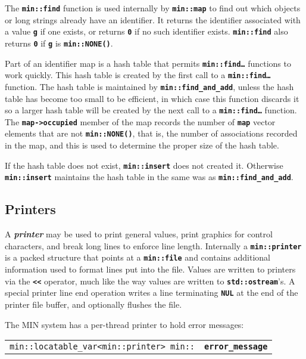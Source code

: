 \documentclass[12pt]{article}
\makeatletter
\newcommand{\TT}[1]{{\tt \bfseries #1}}
\newcommand{\key}[1]{{\bf \em #1}\index{#1}}
\newcommand{\ttindex}[1]{\index{#1@{\tt #1}}}
\newcommand{\EOL}{\penalty \exhyphenpenalty}
\newenvironment{indpar}[1][0.3in]%
	{\begin{list}{}%
		     {\setlength{\itemsep}{0in}%
		      \setlength{\topsep}{0in}%
		      \setlength{\parsep}{1ex}%
		      \setlength{\labelwidth}{#1}%
		      \setlength{\leftmargin}{#1}%
		      \addtolength{\leftmargin}{\labelsep}}%
	 \item}%
	{\end{list}}
\newcommand{\LABEL}[1]{\label{#1}}
\newcommand{\MINKEY}[1]%
	   {\TT{#1}\ttindex{min::#1}\ttindex{#1}}
\makeatother
\begin{document}
The \TT{min::find} function is used internally by \TT{min::map} to find
out which objects or long strings already have an identifier.
It returns the identifier associated with a value \TT{g} if one exists,
or returns \TT{0} if no such identifier exists.
\TT{min::\EOL find} also returns
\TT{0} if \TT{g} is \TT{min::NONE()}.

Part of an identifier map is a hash table that permits
\TT{min::\EOL find\ldots} functions to work quickly.  This
hash table is created by the first call to a
\TT{min::\EOL find\ldots} function.
The hash table is maintained by \TT{min::\EOL find\_\EOL and\_\EOL add},
unless the hash table has become too small to be efficient, in which case
this function discards it so a larger hash table will be created
by the next call to a \TT{min::\EOL find\ldots} function.
The \TT{map->\EOL occupied} member of the map records the number of
\TT{map} vector elements that are not \TT{min::NONE()},
that is, the number of associations recorded in the map, and this is used
to determine the proper size of the hash table.

If the hash table does not exist, \TT{min::\EOL insert} does not created it.
Otherwise \TT{min::\EOL insert} maintains the hash table in the same was
as \TT{min::\EOL find\_\EOL and\_\EOL add}.

\subsection{Printers}
\label{PRINTERS}

A \key{printer} may be used to print general values, print graphics for
control characters, and break long lines to enforce line length.
Internally a \TT{min::\EOL printer} is
a packed structure that points at a \TT{min::\EOL file} and contains
additional information used to format lines put into the file.
Values are written to printers via the \TT{<{}<} operator, much like the
way values are written to \TT{std::\EOL ostream}'s.  A special
printer line end operation writes a line terminating \TT{NUL}
at the end of the printer file buffer, and optionally flushes the file.

The MIN system has a per-thread printer to hold error messages:
\begin{indpar}[1em]\begin{tabular}{r@{}l}
\verb|min::locatable_var<min::printer> min::| & \MINKEY{error\_\EOL message}
\LABEL{MIN::ERROR_MESSAGE}%
\label{ERROR_MESSAGE} \\
\end{tabular}\end{indpar}
\end{document}
